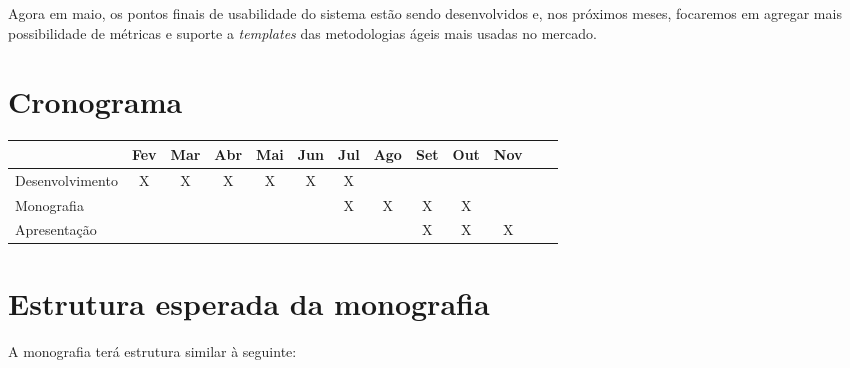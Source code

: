 \documentclass[titlepage]{article}
\begin{document}
Agora em maio, os pontos finais de usabilidade do sistema estão sendo desenvolvidos e, nos próximos meses, focaremos em agregar mais possibilidade de métricas e suporte a \textit{templates} das metodologias ágeis mais usadas no mercado.

\section{Cronograma}
{\small
\begin{tabular}{|l|c|c|c|c|c|c|c|c|c|c|c|c|}
  \hline
  & Fev & Mar & Abr & Mai & Jun & Jul & Ago & Set & Out & Nov \\ \hline
  Desenvolvimento	& X& X& X& X& X& X&  &  &  &   \\ \hline
  Monografia			&  &  &  &  &  & X& X& X& X&   \\ \hline
  Apresentação 		&  &  &  &  &  &  &  & X& X& X \\ \hline
\end{tabular}}

\section{Estrutura esperada da monografia}

A monografia terá estrutura similar à seguinte:
\end{document}
